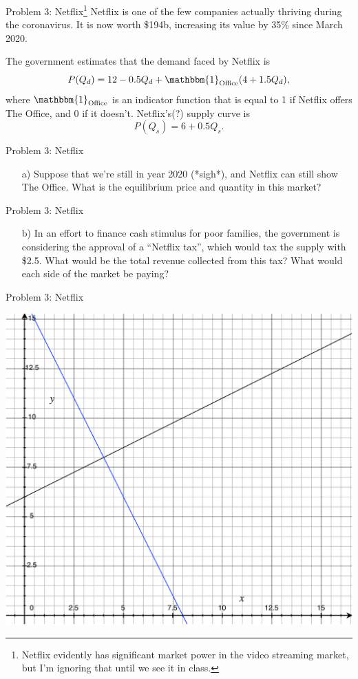 \documentclass[10pt]{beamer}
\begin{document}
\begin{frame}{Problem 3: Netflix\footnote{Netflix evidently has significant market power in the video streaming market, but I'm ignoring that until we see it in class.}}
    Netflix is one of the few companies actually thriving during the coronavirus.
    It is now worth \$194b, increasing its value by 35\% since March 2020.

    The government estimates that the demand faced by Netflix is
    \begin{equation}
        P(Q_d) = 12 - 0.5Q_d + \mathbbm{1}_{\text{Office}} (4 + 1.5Q_d),
    \end{equation}
    where \(\mathbbm{1}_{\text{Office}}\) is an indicator function that is equal to 1 if Netflix offers The Office, and 0 if it doesn't.
    Netflix's(?) supply curve is
    \begin{equation}
        P(Q_s) = 6 + 0.5Q_s.
    \end{equation}
\end{frame}

\begin{frame}[t]{Problem 3: Netflix}
    \begin{enumerate}
        \item[a)] Suppose that we're still in year 2020 (*sigh*), and Netflix can still show The Office. What is the equilibrium price and quantity in this market?
    \end{enumerate}
\end{frame}

\begin{frame}[t]{Problem 3: Netflix}
    \begin{enumerate}
        \item[b)] In an effort to finance cash stimulus for poor families, the government is considering the approval of a ``Netflix tax'', which would tax the supply with \$2.5.
        What would be the total revenue collected from this tax? What would each side of the market be paying? 
    \end{enumerate}
\end{frame}

\begin{frame}{Problem 3: Netflix}
    \begin{center}
        \includegraphics[width=.75\textwidth]{prob3_1.pdf}
    \end{center}
\end{frame}
\end{document}
